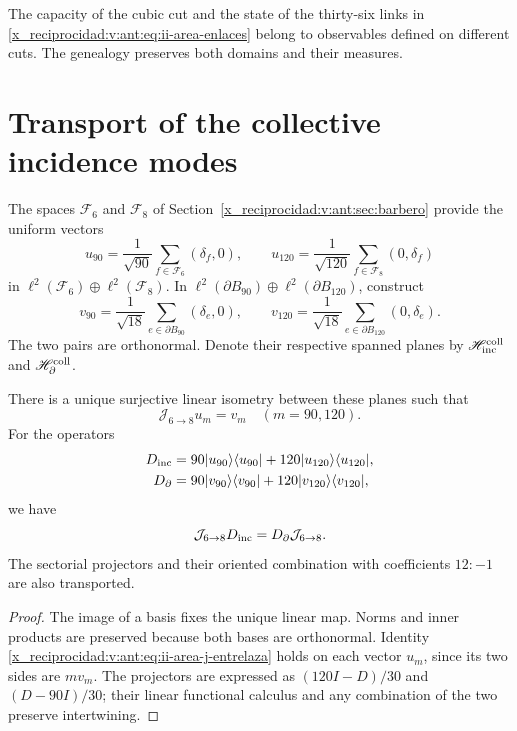 The capacity of the cubic cut and the state of the thirty-six links
in \eqref{x_reciprocidad:v:ant:eq:ii-area-enlaces} belong to observables defined on
different cuts. The genealogy preserves both domains and their measures.

\section{Transport of the collective incidence modes}
\label{x_reciprocidad:v:ant:sec:ii-area-transporte-colectivo}

The spaces \(\mathcal F_6\) and \(\mathcal F_8\) of
Section~\ref{x_reciprocidad:v:ant:sec:barbero} provide the uniform vectors
\[
 u_{90}=\frac1{\sqrt{90}}\sum_{f\in\mathcal F_6}(\delta_f,0),
 \qquad
 u_{120}=\frac1{\sqrt{120}}\sum_{f\in\mathcal F_8}(0,\delta_f)
\]
in \(\ell^2(\mathcal F_6)\oplus\ell^2(\mathcal F_8)\).
In \(\ell^2(\partial B_{90})\oplus\ell^2(\partial B_{120})\),
construct
\[
 v_{90}=\frac1{\sqrt{18}}\sum_{e\in\partial B_{90}}(\delta_e,0),
 \qquad
 v_{120}=\frac1{\sqrt{18}}\sum_{e\in\partial B_{120}}(0,\delta_e).
\]
The two pairs are orthonormal. Denote their respective spanned planes
by \(\mathscr H_{\rm inc}^{\rm coll}\) and
\(\mathscr H_\partial^{\rm coll}\).

\begin{theorem}
\label{x_reciprocidad:v:ant:thm:ii-area-entrelazamiento-colectivo}
There is a unique surjective linear isometry between these planes such that
\begin{equation}
 \mathcal J_{6\to8}u_m=v_m\quad(m=90,120).
 \label{x_reciprocidad:v:ant:eq:ii-area-j-colectivo}
\end{equation}
For the operators
\[
 \begin{aligned}
 D_{\rm inc}&=90|u_{90}\rangle\langle u_{90}|
             +120|u_{120}\rangle\langle u_{120}|,\\
 D_\partial&=90|v_{90}\rangle\langle v_{90}|
             +120|v_{120}\rangle\langle v_{120}|,
 \end{aligned}
\]
we have
\begin{equation}
 \mathcal J_{6\to8}D_{\rm inc}
 =D_\partial\mathcal J_{6\to8}.
 \label{x_reciprocidad:v:ant:eq:ii-area-j-entrelaza}
\end{equation}
The sectorial projectors and their oriented combination with
coefficients \(12:-1\) are also transported.
\end{theorem}
\begin{proof}
The image of a basis fixes the unique linear map. Norms and
inner products are preserved because both bases are orthonormal.
Identity \eqref{x_reciprocidad:v:ant:eq:ii-area-j-entrelaza} holds on each vector
\(u_m\), since its two sides are \(m v_m\). The projectors are
expressed as \((120I-D)/30\) and \((D-90I)/30\); their linear functional
calculus and any combination of the two preserve intertwining.
\end{proof}

